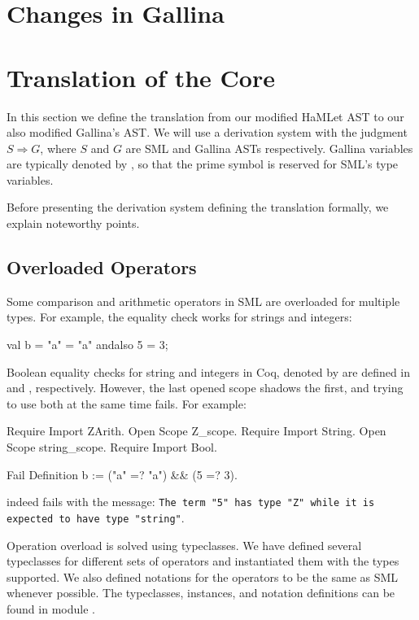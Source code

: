 \documentclass[a4paper,11pt]{article}
\newcommand\stog{\boldsymbol{\Longrightarrow}}
\begin{document}
\section{Changes in Gallina}

\section{Translation of the Core}
In this section we define the translation from our modified HaMLet AST to our
also modified Gallina's AST. We will use a derivation system with the judgment
$S \stog G$, where $S$ and $G$ are SML and Gallina ASTs respectively. Gallina 
variables are typically denoted by , so that the prime symbol 
is reserved for SML's type variables.

Before presenting the derivation system defining the translation
formally, we explain noteworthy points.

\subsection{Overloaded Operators}

Some comparison and arithmetic operators in SML are overloaded for
multiple types. For example, the equality check works for strings and
integers:

\begin{sml}
val b = "a" = "a" andalso 5 = 3;
\end{sml}

Boolean equality checks for string and integers in Coq, denoted by
 are defined in  and ,
respectively. However, the last opened scope shadows the first, and
trying to use both at the same time fails. For example:

\begin{coq}
Require Import ZArith.
Open Scope Z_scope.
Require Import String.
Open Scope string_scope.
Require Import Bool.

Fail Definition b := ("a" =? "a") && (5 =? 3).
\end{coq}

\noindent
indeed fails with the message:
\texttt{The term "5" has type "Z" while it is expected to have type
"string"}.

Operation overload is solved using typeclasses. We have defined
several typeclasses for different sets of operators and instantiated
them with the types supported. We also defined notations for the
operators to be the same as SML whenever possible. The typeclasses,
instances, and notation definitions can be found in module
.
\end{document}
